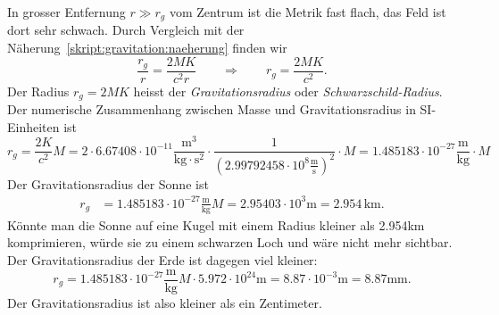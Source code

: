 In grosser Entfernung $r \gg r_g$ vom Zentrum ist die Metrik fast flach,
das Feld ist dort sehr schwach.
Durch Vergleich mit der Näherung~\eqref{skript:gravitation:naeherung}
finden wir
\[
\frac{r_g}{r} = \frac{2MK}{c^2r}
\qquad\Rightarrow\qquad
r_g=\frac{2MK}{c^2}.
\]
Der Radius $r_g=2MK$ heisst der {\em Gravitationsradius} oder 
{\em Schwarzschild-Radius}.
Der numerische Zusammenhang zwischen Masse und Gravitationsradius
in SI-Einheiten ist
\[
r_g = \frac{2K}{c^2}M
=
2\cdot 6.67408\cdot10^{-11}
\frac{\text{m}^3}{\text{kg}\cdot\text{s}^2}
\cdot
\frac1{(2.99792458\cdot 10^{8}\frac{\text{m}}{\text{s}})^2}\cdot M
=
1.485183\cdot 10^{-27}\frac{\text{m}}{\text{kg}}\cdot M
\]
Der Gravitationsradius der Sonne ist 
\begin{align*}
r_g
&=
1.485183\cdot 10^{-27}\frac{\text{m}}{\text{kg}}M
=
2.95403\cdot 10^{3}\text{m}
=
2.954\,\text{km}.
\end{align*}
Könnte man die Sonne auf eine Kugel mit einem Radius kleiner als 2.954km
komprimieren, würde sie zu einem schwarzen Loch und wäre nicht mehr
sichtbar.
Der Gravitationsradius der Erde ist dagegen viel kleiner:
\[
r_g
=
1.485183\cdot 10^{-27}\frac{\text{m}}{\text{kg}}M
\cdot
5.972\cdot 10^{24}\text{m}
=
8.87\cdot 10^{-3}\text{m}
=
8.87\text{mm}.
\]
Der Gravitationsradius ist also kleiner als ein Zentimeter.




